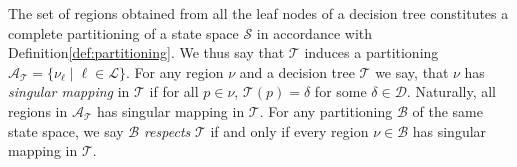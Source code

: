 


The set of regions obtained from all the leaf nodes of a decision tree
constitutes a complete partitioning of a state space $\mathcal{S}$ in accordance
with Definition\ref{def:partitioning}. We thus say that $\mathcal{T}$ induces a
partitioning $\mathcal{A}_{\mathcal{T}} = \{ \nu_{\ell} \mid \ell \in
\mathcal{L} \}$. For any region $\nu$ and a decision tree $\mathcal{T}$ we say,
that $\nu$ has \textit{singular mapping} in $\mathcal{T}$ if for all $p \in
\nu$, $\mathcal{T}(p) = \delta$ for some $\delta \in \mathcal{D}$. Naturally,
all regions in $\mathcal{A}_{\mathcal{T}}$ has singular mapping in
$\mathcal{T}$.  For any partitioning $\mathcal{B}$ of the same state space, we
say $\mathcal{B}$ \textit{respects} $\mathcal{T}$ if and only if every region
$\nu \in \mathcal{B}$ has singular mapping in $\mathcal{T}$.
